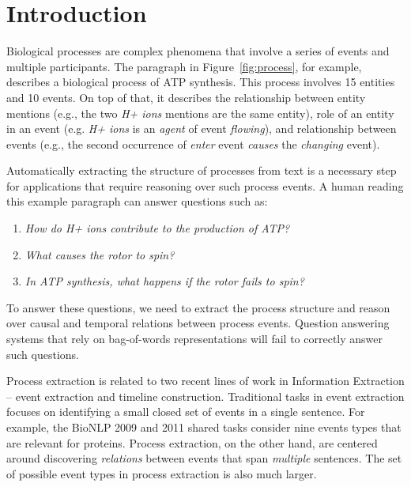 \section{Introduction}

Biological processes are complex phenomena that involve a series of events and multiple participants. 
The paragraph in Figure~\ref{fig:process}, for example, describes a biological process of ATP synthesis.
This process involves 15 entities and 10 events. On top of that,  it describes the relationship between entity mentions (e.g., the two \textit{H+ ions} mentions are the same entity), role of an entity in an event (e.g.  \textit{H+ ions} is an \textit{agent} of event \textit{flowing}), and relationship between events (e.g., the second occurrence of \textit{enter} event \textit{causes} the \textit{changing} event). 

Automatically extracting the structure of processes from text is a necessary step for applications that require reasoning over such process events. 
A human reading this example paragraph can answer questions such as:
\begin{enumerate}[itemsep=0pt,topsep=0pt] 
\item \footnotesize \emph{How do H+ ions contribute to the production of ATP?}
\item \footnotesize\emph{What causes the rotor to spin?}
\item \footnotesize \emph{In ATP synthesis, what happens if the rotor fails to spin?}
\end{enumerate}
\noindent To answer these questions, we need to extract the process structure and reason over causal and temporal relations between process events. 
Question answering systems that rely on bag-of-words representations will fail to correctly answer such questions.


Process extraction is related to two recent lines of work in Information Extraction -- event extraction and timeline construction.
Traditional tasks in event extraction focuses on identifying a small closed set of events in a single sentence. 
For example, the BioNLP 2009 and 2011 shared tasks \cite{kim09,kim11} consider nine events types that are relevant for proteins.
Process extraction, on the other hand, are centered around discovering \emph{relations} between events that span \emph{multiple} sentences. The set of possible event types in process extraction is also much larger.

